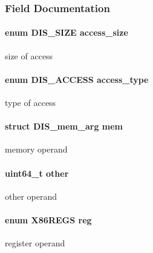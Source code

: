 \subsubsection{Field Documentation}
\hypertarget{struct_d_i_s__arg_abe85ed51a3596cdb3a868a284c3d961f}{
\paragraph[{access\_\-size}]{\setlength{\rightskip}{0pt plus 5cm}enum {\bf DIS\_\-SIZE} {\bf access\_\-size}}\hfill}
\label{struct_d_i_s__arg_abe85ed51a3596cdb3a868a284c3d961f}
size of access \hypertarget{struct_d_i_s__arg_a5a7d33b48f73c1d560377f10471d8b00}{
\paragraph[{access\_\-type}]{\setlength{\rightskip}{0pt plus 5cm}enum {\bf DIS\_\-ACCESS} {\bf access\_\-type}}\hfill}
\label{struct_d_i_s__arg_a5a7d33b48f73c1d560377f10471d8b00}
type of access \hypertarget{struct_d_i_s__arg_a883edefb091b4875ffd7bb1f1e61dea3}{
\paragraph[{mem}]{\setlength{\rightskip}{0pt plus 5cm}struct {\bf DIS\_\-mem\_\-arg} {\bf mem}}\hfill}
\label{struct_d_i_s__arg_a883edefb091b4875ffd7bb1f1e61dea3}
memory operand \hypertarget{struct_d_i_s__arg_aabf8b24bd58cc13ea953e9add24d4387}{
\paragraph[{other}]{\setlength{\rightskip}{0pt plus 5cm}uint64\_\-t {\bf other}}\hfill}
\label{struct_d_i_s__arg_aabf8b24bd58cc13ea953e9add24d4387}
other operand \hypertarget{struct_d_i_s__arg_a426daf7e6de8cea3128731107457d2cf}{
\paragraph[{reg}]{\setlength{\rightskip}{0pt plus 5cm}enum {\bf X86REGS} {\bf reg}}\hfill}
\label{struct_d_i_s__arg_a426daf7e6de8cea3128731107457d2cf}
register operand 